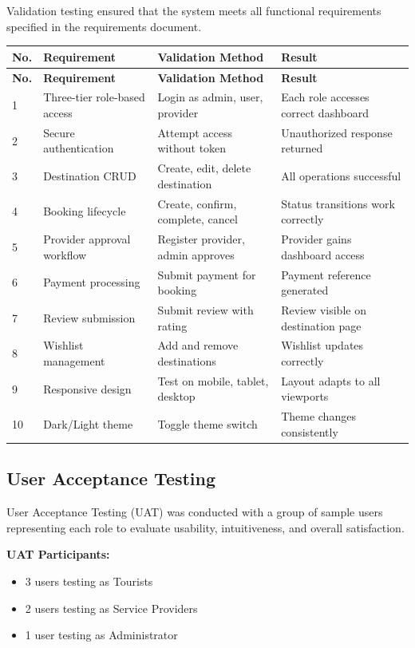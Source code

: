 Validation testing ensured that the system meets all functional requirements specified in the requirements document.

\begin{longtable}{|p{0.5cm}|p{4.5cm}|p{4cm}|p{3.5cm}|}
\hline
\textbf{No.} & \textbf{Requirement} & \textbf{Validation Method} & \textbf{Result} \\
\hline
\endfirsthead
\hline
\textbf{No.} & \textbf{Requirement} & \textbf{Validation Method} & \textbf{Result} \\
\hline
\endhead
1 & Three-tier role-based access & Login as admin, user, provider & Each role accesses correct dashboard \\
\hline
2 & Secure authentication & Attempt access without token & Unauthorized response returned \\
\hline
3 & Destination CRUD & Create, edit, delete destination & All operations successful \\
\hline
4 & Booking lifecycle & Create, confirm, complete, cancel & Status transitions work correctly \\
\hline
5 & Provider approval workflow & Register provider, admin approves & Provider gains dashboard access \\
\hline
6 & Payment processing & Submit payment for booking & Payment reference generated \\
\hline
7 & Review submission & Submit review with rating & Review visible on destination page \\
\hline
8 & Wishlist management & Add and remove destinations & Wishlist updates correctly \\
\hline
9 & Responsive design & Test on mobile, tablet, desktop & Layout adapts to all viewports \\
\hline
10 & Dark/Light theme & Toggle theme switch & Theme changes consistently \\
\hline
\end{longtable}

\subsection{User Acceptance Testing}

User Acceptance Testing (UAT) was conducted with a group of sample users representing each role to evaluate usability, intuitiveness, and overall satisfaction.

\textbf{UAT Participants:}
\begin{itemize}[leftmargin=2em]
    \item 3 users testing as Tourists
    \item 2 users testing as Service Providers
    \item 1 user testing as Administrator
\end{itemize}

